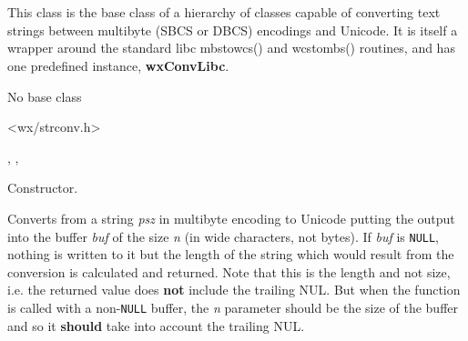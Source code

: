 %
%

\section{}\label{wxmbconv}

This class is the base class of a hierarchy of classes capable of converting
text strings between multibyte (SBCS or DBCS) encodings and Unicode. It is itself
a wrapper around the standard libc mbstowcs() and wcstombs() routines, and has
one predefined instance, {\bf wxConvLibc}.


No base class


<wx/strconv.h>


, 
, 



\label{wxmbconvwxmbconv}


Constructor.

\label{wxmbconvmb2wc}


Converts from a string {\it psz} in multibyte encoding to Unicode putting the
output into the buffer {\it buf} of the size {\it n} (in wide characters, not
bytes). If {\it buf} is {\tt NULL}, nothing is written to it but the length of
the string which would result from the conversion is calculated and returned.
Note that this is the length and not size, i.e. the returned value does 
{\bf not} include the trailing NUL. But when the function is called with a
non-{\tt NULL} buffer, the {\it n} parameter should be the size of the buffer
and so it {\bf should} take into account the trailing NUL.



